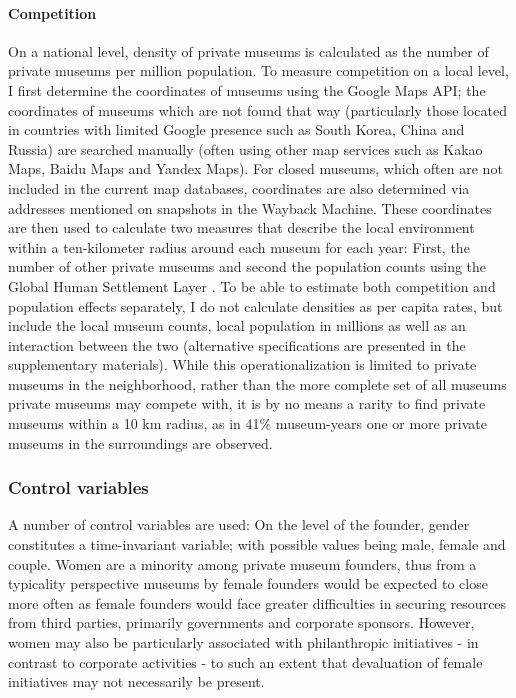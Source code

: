 \documentclass[12pt]{article}
\begin{document}
\paragraph*{Competition}

On a national level, density of private museums is calculated as the number of private museums per million population.
To measure competition on a local level, I first determine the coordinates of museums using the Google Maps API; the coordinates of museums which are not found that way (particularly those located in countries with limited Google presence such as South Korea, China and Russia) are searched manually (often using other map services such as Kakao Maps, Baidu Maps and Yandex Maps).
For closed museums, which often are not included in the current map databases, coordinates are also determined via addresses mentioned on snapshots in the Wayback Machine.
These coordinates are then used to calculate two measures that describe the local environment within a ten-kilometer radius around each museum for each year:
First, the number of other private museums and second the population counts using the Global Human Settlement Layer \parencite{EC_2023_GHSL}. 
To be able to estimate both competition and population effects separately, I do not calculate densities as per capita rates, but include the local museum counts, local population in millions as well as an interaction between the two (alternative specifications are presented in the supplementary materials).
While this operationalization is limited to private museums in the neighborhood, rather than the more complete set of all museums private museums may compete with, it is by no means a rarity to find private museums within a 10 km radius, as in 41\% museum-years one or more private museums in the surroundings are observed. 
\subsubsection*{Control variables}


\bigbreak
\noindent
A number of control variables are used: 
On the level of the founder, gender constitutes a time-invariant variable; with possible values being male, female and couple.
Women are a minority among private museum founders, thus from a typicality perspective \parencite{Rosch_1975_family} museums by female founders would be expected to close more often as female founders would face greater difficulties in securing resources from third parties, primarily governments and corporate sponsors.
However, women may also be particularly associated with philanthropic initiatives - in contrast to corporate activities \parencite{Milam_2013_artgirls} - to such an extent that devaluation of female initiatives may not necessarily be present.
\end{document}
